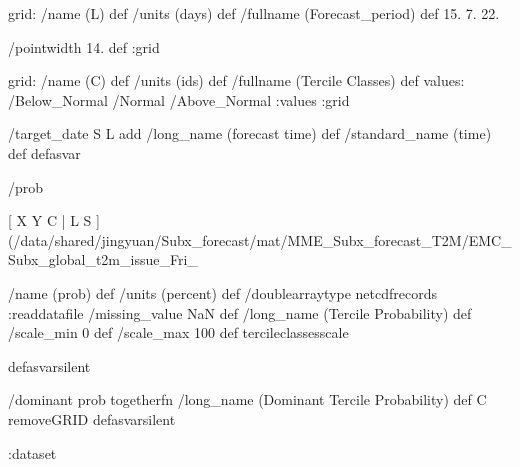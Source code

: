\begin{ingrid}
grid:
/name (L) def
/units (days) def
/fullname (Forecast_period) def
15. 7. 22. 

/pointwidth 14. def
:grid

grid:
/name (C) def
/units (ids) def
/fullname (Tercile Classes) def
values: /Below_Normal /Normal /Above_Normal :values
:grid

/target_date { S L add /long_name (forecast time) def /standard_name (time) def } defasvar

/prob {
[ X Y C | L S ] (/data/shared/jingyuan/Subx_forecast/mat/MME_Subx_forecast_T2M/EMC_Subx_global_t2m_issue_Fri_%

/name (prob) def
/units (percent) def
/doublearraytype netcdfrecords :readdatafile
/missing_value NaN def
/long_name (Tercile Probability) def
/scale_min 0 def
/scale_max 100 def
tercileclassesscale
} defasvarsilent

/dominant {
prob togetherfn
/long_name (Dominant Tercile Probability) def
C removeGRID
} defasvarsilent

:dataset
\end{ingrid}
